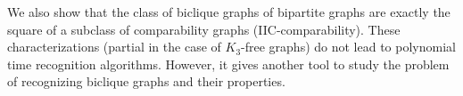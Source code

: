 \documentclass{article}
\begin{document}
We also show that the class of  biclique graphs of
bipartite graphs are exactly the square of a subclass of comparability
graphs (IIC-comparability). These characterizations (partial in the case
of  $K_3$-free  graphs)  do  not lead  to  polynomial  time  recognition
algorithms. However, it  gives another  tool to  study the  problem of
recognizing biclique graphs and their properties.




%







% 
\end{document}
